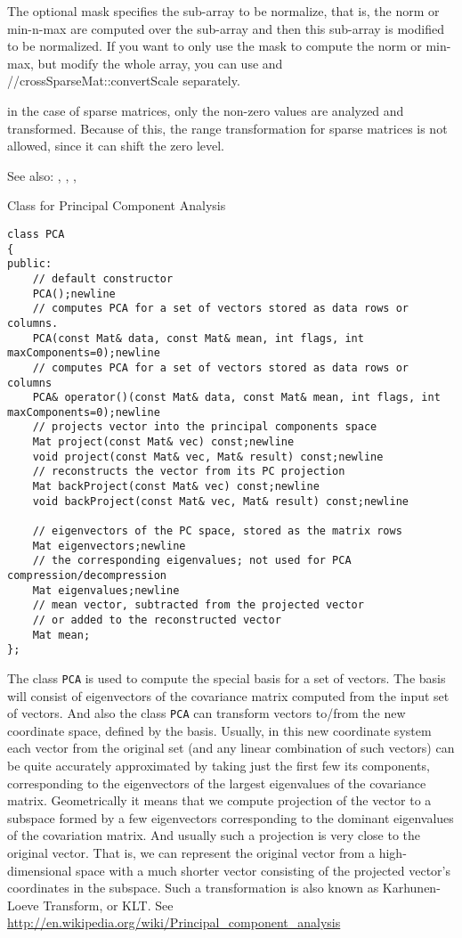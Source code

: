 The optional mask specifies the sub-array to be normalize, that is, the norm or min-n-max are computed over the sub-array and then this sub-array is modified to be normalized. If you want to only use the mask to compute the norm or min-max, but modify the whole array, you can use  and //cross{SparseMat::convertScale} separately.

in the case of sparse matrices, only the non-zero values are analyzed and transformed. Because of this, the range transformation for sparse matrices is not allowed, since it can shift the zero level. 

See also: , , , 


Class for Principal Component Analysis

\begin{lstlisting}
class PCA
{
public:
    // default constructor
    PCA();newline
    // computes PCA for a set of vectors stored as data rows or columns.
    PCA(const Mat& data, const Mat& mean, int flags, int maxComponents=0);newline
    // computes PCA for a set of vectors stored as data rows or columns
    PCA& operator()(const Mat& data, const Mat& mean, int flags, int maxComponents=0);newline
    // projects vector into the principal components space
    Mat project(const Mat& vec) const;newline
    void project(const Mat& vec, Mat& result) const;newline
    // reconstructs the vector from its PC projection
    Mat backProject(const Mat& vec) const;newline
    void backProject(const Mat& vec, Mat& result) const;newline

    // eigenvectors of the PC space, stored as the matrix rows
    Mat eigenvectors;newline
    // the corresponding eigenvalues; not used for PCA compression/decompression
    Mat eigenvalues;newline
    // mean vector, subtracted from the projected vector
    // or added to the reconstructed vector
    Mat mean;
};
\end{lstlisting}

The class \texttt{PCA} is used to compute the special basis for a set of vectors. The basis will consist of eigenvectors of the covariance matrix computed from the input set of vectors. And also the class \texttt{PCA} can transform vectors to/from the new coordinate space, defined by the basis. Usually, in this new coordinate system each vector from the original set (and any linear combination of such vectors) can be quite accurately approximated by taking just the first few its components, corresponding to the eigenvectors of the largest eigenvalues of the covariance matrix. Geometrically it means that we compute projection of the vector to a subspace formed by a few eigenvectors corresponding to the dominant eigenvalues of the covariation matrix. And usually such a projection is very close to the original vector. That is, we can represent the original vector from a high-dimensional space with a much shorter vector consisting of the projected vector's coordinates in the subspace. Such a transformation is also known as Karhunen-Loeve Transform, or KLT. See \url{http://en.wikipedia.org/wiki/Principal\_component\_analysis}

